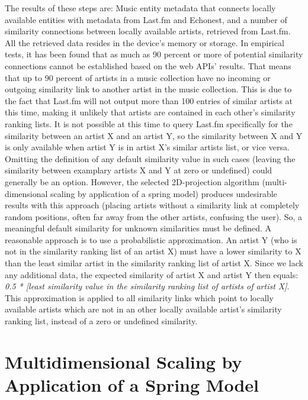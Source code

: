 The results of these steps are: Music entity metadata that connects locally available entities with metadata from Last.fm and Echonest, and a number of similarity connections between locally available artists, retrieved from Last.fm. All the retrieved data resides in the device's memory or storage. In empirical tests, it has been found that as much as 90 percent or more of potential similarity connections cannot be established based on the web APIs' results. That means that up to 90 percent of artists in a music collection have no incoming or outgoing similarity link to another artist in the music collection. This is due to the fact that Last.fm will not output more than 100 entries of similar artists at this time, making it unlikely that artists are contained in each other's similarity ranking lists. It is not possible at this time to query Last.fm specifically for the similarity between an artist X and an artist Y, so the similarity between X and Y is only available when artist Y is in artist X's similar artists list, or vice versa. 
Omitting the definition of any default similarity value in such cases (leaving the similarity between examplary artists X and Y at zero or undefined) could generally be an option. However, the selected 2D-projection algorithm (multi-dimensional scaling  by application of a spring model) produces undesirable results with this approach (placing artists without a similarity link at completely random positions, often far away from the other artists, confusing the user).
So, a meaningful default similarity for unknown similarities must be defined. A reasonable approach is to use a probabilistic approximation. An artist Y (who is not in the similarity ranking list of an artist X) must have a lower similarity to X than the least similar artist in the similarity ranking list of artist X. Since we lack any additional data, the expected similarity of artist X and artist Y then equals:\\
\emph{0.5 * [least similarity value in the similarity ranking list of artists of artist X]}.\\
This approximation is applied to all similarity links which point to locally available artists which are not in an other locally available artist's similarity ranking list, instead of a zero or undefined similarity.

\section{Multidimensional Scaling by Application of a Spring Model}
\label{sec:mds-algorithm}

